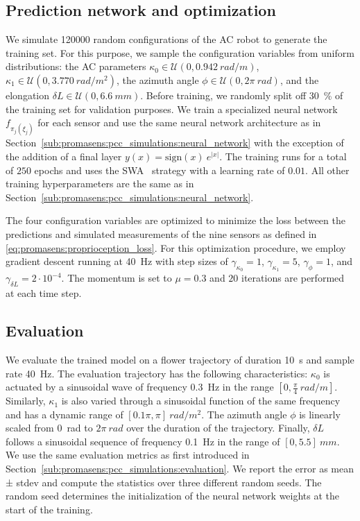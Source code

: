 \subsection{Prediction network and optimization}\label{sub:promasens:ac_simulations:network_optimization}
We simulate \SI{120000}{} random configurations of the \gls{AC} robot to generate the training set. For this purpose, we sample the configuration variables from uniform distributions: the \gls{AC} parameters $\kappa_0 \in \mathcal{U}(0, \SI{0.942}{rad \per m})$, $\kappa_1 \in \mathcal{U}(0, \SI{3.770}{rad \per m^2})$, the azimuth angle $\phi \in \mathcal{U}(0, 2 \pi \: \si{rad})$, and the elongation $\delta L \in \mathcal{U}(0, \SI{6.6}{mm})$.
Before training, we randomly split off \SI{30}{\percent} of the training set for validation purposes.
We train a specialized neural network $f_{\pi_j(\xi_j)}$ for each sensor and use the same neural network architecture as in Section~\ref{sub:promasens:pcc_simulations:neural_network} with the exception of the addition of a final layer $y(x) = \mathrm{sign}(x) \: e^{|x|}$. 
The training runs for a total of $250$ epochs and uses the SWA~\citep{izmailov2018averaging} strategy with a learning rate of $0.01$. 
All other training hyperparameters are the same as in Section~\ref{sub:promasens:pcc_simulations:neural_network}.

The four configuration variables are optimized to minimize the loss between the predictions and simulated measurements of the nine sensors as defined in \ref{eq:promasens:proprioception_loss}.
For this optimization procedure, we employ gradient descent running at \SI{40}{Hz} with step sizes of $\gamma_{\kappa_0} = 1$, $\gamma_{\kappa_1} = 5$, $\gamma_{\phi} = 1$, and $\gamma_{\delta L} = 2 \cdot 10^{-4}$. The momentum is set to $\mu = 0.3$ and $20$ iterations are performed at each time step.

\subsection{Evaluation}\label{sub:promasens:ac_simulations:evaluation}
We evaluate the trained model on a flower trajectory of duration \SI{10}{s} and sample rate \SI{40}{Hz}. The evaluation trajectory has the following characteristics: $\kappa_0$ is actuated by a sinusoidal wave of frequency \SI{0.3}{Hz} in the range $[0, \frac{\pi}{4} \: \si{rad \per m}]$. Similarly, $\kappa_1$ is also varied through a sinusoidal function of the same frequency and has a dynamic range of $[0.1 \pi, \pi] \: \si{rad \per m^2}$.
The azimuth angle $\phi$ is linearly scaled from \SI{0}{rad} to $2 \pi \: \si{rad}$ over the duration of the trajectory.
Finally, $\delta L$ follows a sinusoidal sequence of frequency \SI{0.1}{Hz} in the range of $[0, 5.5] \: \si{mm}$.
We use the same evaluation metrics as first introduced in Section~\ref{sub:promasens:pcc_simulations:evaluation}.
We report the error as mean ± stdev and compute the statistics over three
different random seeds. The random seed determines the initialization of the neural network weights at the start of the training.

